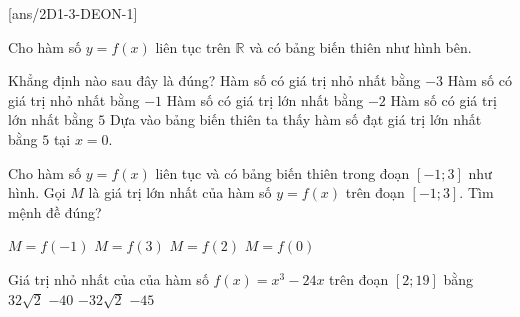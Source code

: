 \boxde
\BTTN
{}[ans/2D1-3-DEON-1]
\begin{ex}%
    Cho hàm số $y=f(x)$ liên tục trên $\mathbb{R}$ và có bảng biến thiên như hình bên.
    \begin{center}
    \end{center}
    Khẳng định nào sau đây là đúng?
    \choice
    {Hàm số có giá trị nhỏ nhất bằng $-3$}
    {Hàm số có giá trị nhỏ nhất bằng $-1$}
    {Hàm số có giá trị lớn nhất bằng $-2$}
    {\True Hàm số có giá trị lớn nhất bằng $5$}
    \loigiai
    {
        Dựa vào bảng biến thiên ta thấy hàm số đạt giá trị lớn nhất bằng $5$ tại $x=0$.
    }
\end{ex}
\begin{ex}%
    Cho hàm số $y=f(x)$ liên tục và có bảng biến thiên trong đoạn $[-1;3]$ như hình. Gọi $M$ là giá trị lớn nhất của hàm số $y=f(x)$ trên đoạn $\left[-1;3\right]$. Tìm mệnh đề đúng?
    \begin{center}
    \end{center}
    \choice
    {$M=f(-1)$}
    {$M=f(3)$}
    {$M=f(2)$}
    {\True $M=f(0)$}
\end{ex}
\begin{ex}%
    Giá trị nhỏ nhất của của hàm số $f(x)=x^3-24x$ trên đoạn $[2;19]$ bằng
    \choice
    {$32\sqrt{2}$}
    {$-40$}
    {\True $-32\sqrt{2}$}
    {$-45$}
\end{ex}
